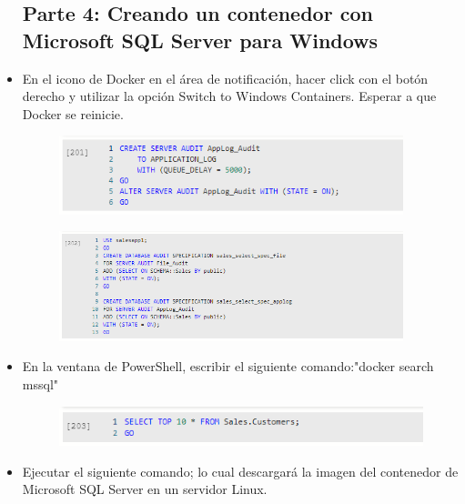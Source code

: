 \begin{itemize}
\subsection{Parte 4: Creando un contenedor con Microsoft SQL Server para Windows}
	\item En el icono de Docker en el área de notificación, hacer click con el botón derecho y utilizar la opción Switch to Windows Containers. Esperar a que Docker se reinicie.
                      \begin{figure}[H]
		\begin{center}
		\includegraphics[width=10cm]{./Imagenes/s29}
		\end{center}
		\end{figure}   
                      \begin{figure}[H]
		\begin{center}
		\includegraphics[width=10cm]{./Imagenes/s30}
		\end{center}
		\end{figure}   
	\item En la ventana de PowerShell, escribir el siguiente comando:"docker search mssql"           
                       \begin{figure}[H]
		\begin{center}
		\includegraphics[width=15cm]{./Imagenes/s31}
		\end{center}
		\end{figure}   
          \item Ejecutar el siguiente comando; lo cual descargará la imagen del contenedor de Microsoft SQL Server en un servidor Linux.
		\begin{figure}[H]
		\begin{center}

\end{center}
\end{figure}
\end{itemize}
